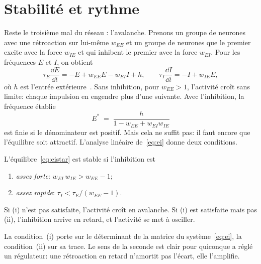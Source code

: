 \section{Stabilité et rythme}

Reste le troisième mal du réseau : l'avalanche. Prenons un groupe de neurones  avec une rétroaction sur lui-même $w_{EE}$ et un groupe de neurones  que le premier excite avec la force $w_{IE}$ et qui inhibent le premier avec la force $w_{EI}$. Pour les fréquences $E$ et $I$, on obtient
\begin{equation}
\tau_E\frac{\dd E}{\dd t} = -E + w_{EE}E - w_{EI}I + h, \qquad
\tau_I\frac{\dd I}{\dd t} = -I + w_{IE}E ,
\label{eq:ei}
\end{equation}
où $h$ est l'entrée extérieure~\cite{WilsonCowan1972}. Sans inhibition, pour $w_{EE}>1$, l'activité croît sans limite: chaque impulsion en engendre plus d'une suivante. Avec l'inhibition, la fréquence établie
\begin{equation}
E^* \;=\; \frac{h}{1-w_{EE}+w_{EI}w_{IE}}
\label{eq:eistar}
\end{equation}
est finie si le dénominateur est positif. Mais cela ne suffit pas: il faut encore que l'équilibre soit attractif. L'analyse linéaire de~\eqref{eq:ei} donne deux conditions.

\begin{keyblock}
\begin{proposition}
\label{prop:ei}
L'équilibre~\eqref{eq:eistar} est stable si l'inhibition est
\begin{enumerate}
\item[(i)] \emph{assez forte}: $w_{EI}\,w_{IE} > w_{EE}-1$;
\item[(ii)] \emph{assez rapide}: $\tau_I < \tau_E/(w_{EE}-1)$.
\end{enumerate}
Si (i) n'est pas satisfaite, l'activité croît en avalanche. Si (i) est satisfaite mais pas (ii), l'inhibition arrive en retard, et l'activité se met à osciller.
\end{proposition}
\end{keyblock}

La condition~(i) porte sur le déterminant de la matrice du système~\eqref{eq:ei}, la condition~(ii) sur sa trace. Le sens de la seconde est clair pour quiconque a réglé un régulateur: une rétroaction en retard n'amortit pas l'écart, elle l'amplifie.

